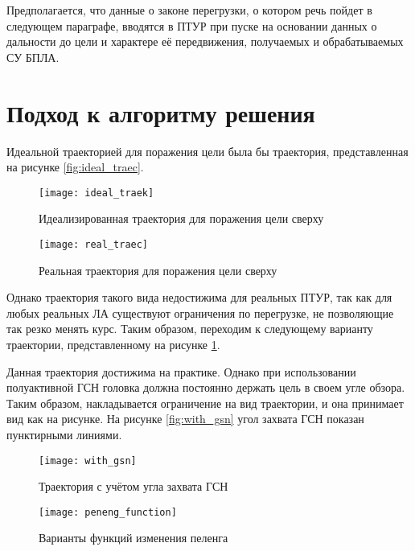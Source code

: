 Предполагается, что данные о законе перегрузки, о котором речь пойдет в следующем параграфе, вводятся в ПТУР при пуске на основании данных о дальности до цели и характере её передвижения, получаемых и обрабатываемых СУ БПЛА.

\section{Подход к алгоритму решения}
Идеальной траекторией для поражения цели была бы траектория, представленная на рисунке \ref{fig:ideal_traec}.

\begin{figure}[h]
\begin{center}
	\begin{minipage}[h]{0.47\linewidth}
		\texttt{[image: ideal\_traek]}
		\caption{Идеализированная траектория для поражения цели сверху}
		\label{fig:ideal_traec}
	\end{minipage}
	\hfill
	\begin{minipage}[h]{0.47\linewidth}
		\texttt{[image: real\_traec]}
		\caption{Реальная траектория для поражения цели сверху}
		\label{fig:real_traec}
	\end{minipage}
\end{center}
\end{figure}

Однако траектория такого вида недостижима для реальных ПТУР, так как для любых реальных ЛА существуют ограничения по перегрузке, не позволяющие так резко менять курс. Таким образом, переходим к следующему варианту траектории, представленному на рисунке \ref{fig:real_traec}.

Данная траектория достижима на практике. Однако при использовании полуактивной ГСН головка должна постоянно держать цель в своем угле обзора. Таким образом, накладывается ограничение на вид траектории, и она принимает вид как на рисунке. На рисунке \ref{fig:with_gsn} угол захвата ГСН показан пунктирными линиями.

\begin{figure}[h]
\begin{center}
	\begin{minipage}[h]{0.47\linewidth}
		\texttt{[image: with\_gsn]}
		\caption{Траектория с учётом угла захвата ГСН}
		\label{fig:with_gsn}
	\end{minipage}
	\hfill
	\begin{minipage}[h]{0.4\linewidth}
		\texttt{[image: peneng\_function]}
		\caption{Варианты функций изменения пеленга}
		\label{fig:peleng_function}
	\end{minipage}
\end{center}
\end{figure}


